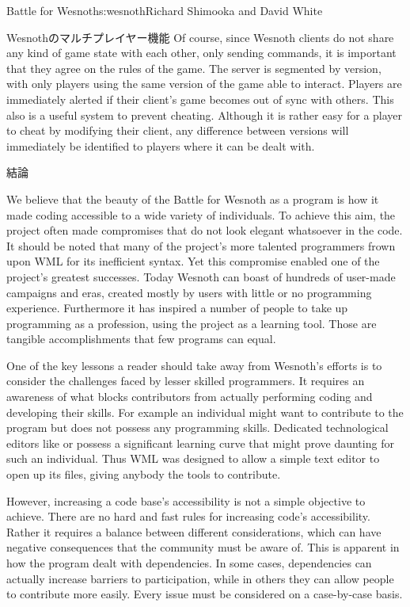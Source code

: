 \begin{aosachapter}{Battle for Wesnoth}{s:wesnoth}{Richard Shimooka and David White}
\begin{aosasect1}{Wesnothのマルチプレイヤー機能}
Of course, since Wesnoth clients do not share any kind of game state
with each other, only sending commands, it is important that they
agree on the rules of the game. The server is segmented by version,
with only players using the same version of the game able to
interact. Players are immediately alerted if their client's game
becomes out of sync with others. This also is a useful system to
prevent cheating. Although it is rather easy for a player to cheat by
modifying their client, any difference between versions will
immediately be identified to players where it can be dealt with.

\end{aosasect1}

\begin{aosasect1}{結論}

We believe that the beauty of the Battle for Wesnoth as a program is
how it made coding accessible to a wide variety of individuals. To
achieve this aim, the project often made compromises that do not look
elegant whatsoever in the code. It should be noted that many of the
project's more talented programmers frown upon WML for its inefficient
syntax. Yet this compromise enabled one of the project's greatest
successes. Today Wesnoth can boast of hundreds of user-made campaigns
and eras, created mostly by users with little or no programming
experience. Furthermore it has inspired a number of people to take up
programming as a profession, using the project as a learning
tool. Those are tangible accomplishments that few programs can equal.

One of the key lessons a reader should take away from Wesnoth's
efforts is to consider the challenges faced by lesser skilled
programmers. It requires an awareness of what blocks contributors from
actually performing coding and developing their skills. For example an
individual might want to contribute to the program but does not
possess any programming skills. Dedicated technological editors like
 or  possess a significant learning curve that
might prove daunting for such an individual. Thus WML was designed to
allow a simple text editor to open up its files, giving anybody the
tools to contribute.

However, increasing a code base's accessibility is not a simple
objective to achieve. There are no hard and fast rules for increasing
code's accessibility. Rather it requires a balance between different
considerations, which can have negative consequences that the
community must be aware of. This is apparent in how the program dealt
with dependencies. In some cases, dependencies can actually increase
barriers to participation, while in others they can allow people to
contribute more easily. Every issue must be considered on a
case-by-case basis.


\end{aosasect1}
\end{aosachapter}
